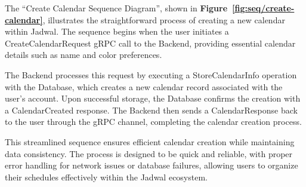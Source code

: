 The ``Create Calendar Sequence Diagram'', shown in \textbf{Figure~\ref{fig:seq/create-calendar}}, illustrates the straightforward process of creating a new calendar within Jadwal. The sequence begins when the user initiates a CreateCalendarRequest gRPC call to the Backend, providing essential calendar details such as name and color preferences.

The Backend processes this request by executing a StoreCalendarInfo operation with the Database, which creates a new calendar record associated with the user's account. Upon successful storage, the Database confirms the creation with a CalendarCreated response. The Backend then sends a CalendarResponse back to the user through the gRPC channel, completing the calendar creation process.

This streamlined sequence ensures efficient calendar creation while maintaining data consistency. The process is designed to be quick and reliable, with proper error handling for network issues or database failures, allowing users to organize their schedules effectively within the Jadwal ecosystem.